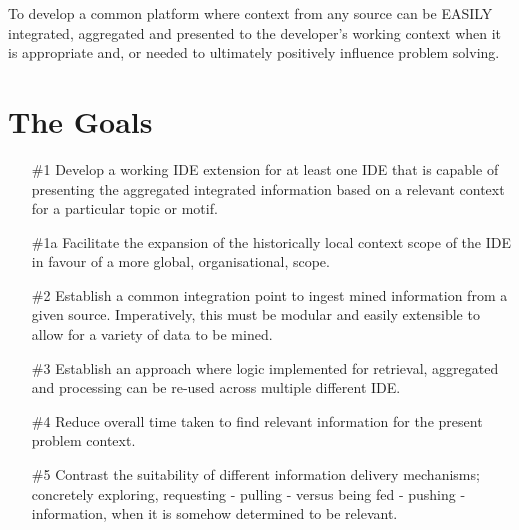 To develop a common platform where context from any source can be EASILY integrated, aggregated and presented to the developer's working context when it is appropriate and, or needed to ultimately positively influence problem solving. 

\section{The Goals}

\begin{enumerate}
	\item[\#1] Develop a working IDE extension for at least one IDE that is capable of presenting the aggregated integrated information based on a relevant context for a particular topic or motif. 
	
	\item[\#1a] Facilitate the expansion of the historically local context scope of the IDE in favour of a more global, organisational, scope.
	
	\item[\#2] Establish a common integration point to ingest mined information from a given source. Imperatively, this must be modular and easily extensible to allow for a variety of data to be mined.
	
	\item[\#3] Establish an approach where logic implemented for retrieval, aggregated and processing can be re-used across multiple different IDE.
	
	\item[\#4] Reduce overall time taken to find relevant information for the present problem context.
	
	\item[\#5] Contrast the suitability of different information delivery mechanisms; concretely exploring, requesting - pulling - versus being fed - pushing - information, when it is somehow determined to be relevant. 
	
\end{enumerate}